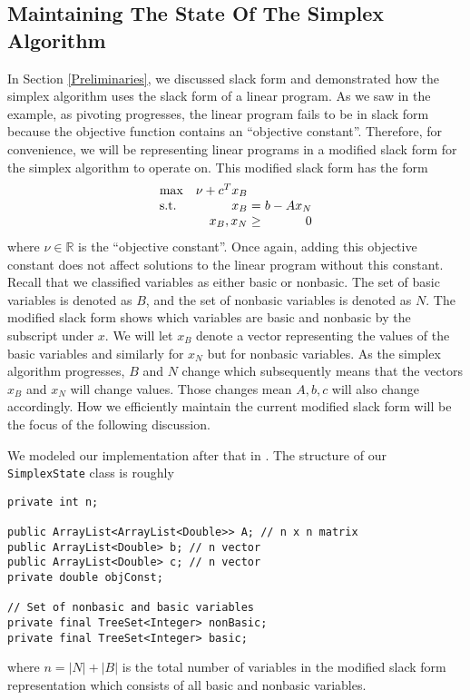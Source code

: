 \documentclass{article}
\newcommand{\javaCode}[1]{\texttt{#1}}
\begin{document}
\subsection{Maintaining The State Of The Simplex Algorithm}
In Section \ref{Preliminaries}, we discussed slack form and demonstrated how the simplex algorithm uses the slack form of a linear program. As we saw in the example, as pivoting progresses, the linear program fails to be in slack form because the objective function contains an ``objective constant''. Therefore, for convenience, we will be representing linear programs in a modified slack form for the simplex algorithm to operate on. This modified slack form has the form
\begin{equation*}
\setlength\arraycolsep{1.5pt}
  \begin{array}{l@{\quad} r c r} 
    \max          & \nu + c^{T}x_B & & \\
    \mathrm{s.t.} &  x_B & = & b - Ax_N \\
                  & x_B, x_N & \geq &  0 \\
  \end{array}
\end{equation*}
where $\nu \in \mathbb{R}$ is the ``objective constant''. Once again, adding this objective constant does not affect solutions to the linear program without this constant. Recall that we classified variables as either basic or nonbasic. The set of basic variables is denoted as $B$, and the set of nonbasic variables is denoted as $N$. The modified slack form shows which variables are basic and nonbasic by the subscript under $x$. We will let $x_B$ denote a vector representing the values of the basic variables and similarly for $x_N$ but for nonbasic variables. As the simplex algorithm progresses, $B$ and $N$ change which subsequently means that the vectors $x_B$ and $x_N$ will change values. Those changes mean $A, b, c$ will also change accordingly. How we efficiently maintain the current modified slack form will be the focus of the following discussion.

We modeled our implementation after that in \cite{CLRS}. The structure of our \javaCode{SimplexState} class is roughly
\begin{verbatim}
private int n;

public ArrayList<ArrayList<Double>> A; // n x n matrix
public ArrayList<Double> b; // n vector
public ArrayList<Double> c; // n vector
private double objConst;

// Set of nonbasic and basic variables
private final TreeSet<Integer> nonBasic;
private final TreeSet<Integer> basic;
\end{verbatim}
where $n = |N| + |B|$ is the total number of variables in the modified slack form representation which consists of all basic and nonbasic variables. 
\end{document}
